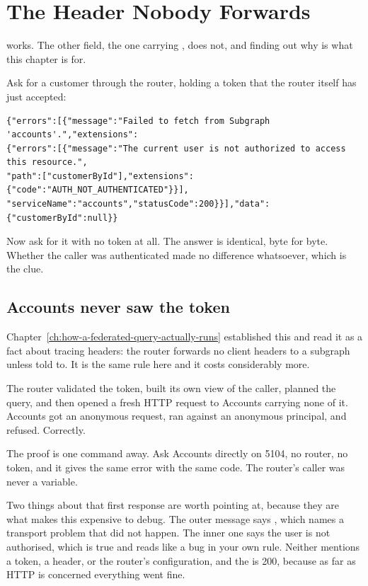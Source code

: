 \section{The Header Nobody Forwards}
\label{sec:ch15-the-header-nobody-forwards}
%

 works. The other field, the one carrying
\code{[Authorize]}, does not, and finding out why is what this chapter is for.

Ask for a customer through the router, holding a token that the router itself
has just accepted:

\begin{verbatim}
{"errors":[{"message":"Failed to fetch from Subgraph 'accounts'.","extensions":
{"errors":[{"message":"The current user is not authorized to access this resource.",
"path":["customerById"],"extensions":{"code":"AUTH_NOT_AUTHENTICATED"}}],
"serviceName":"accounts","statusCode":200}}],"data":{"customerById":null}}
\end{verbatim}

Now ask for it with no token at all. The answer is identical, byte for byte.
Whether the caller was authenticated made no difference whatsoever, which is
the clue.

\subsection*{Accounts never saw the token}

%
Chapter~\ref{ch:how-a-federated-query-actually-runs} established this and read
it as a fact about tracing headers: the router forwards no client headers to a
subgraph unless told to. It is the same rule here and it costs considerably
more.

The router validated the token, built its own view of the caller, planned the
query, and then opened a fresh HTTP request to Accounts carrying none of it.
Accounts got an anonymous request, ran \code{[Authorize]} against an anonymous
principal, and refused. Correctly.

The proof is one command away. Ask Accounts directly on 5104, no router, no
token, and it gives the same error with the same code. The router's caller was
never a variable.

Two things about that first response are worth pointing at, because they are
what makes this expensive to debug. The outer message says
, which names a transport
problem that did not happen. The inner one says the user is not authorised,
which is true and reads like a bug in your own rule. Neither mentions a token,
a header, or the router's configuration, and the  is 200,
because as far as HTTP is concerned everything went fine.

